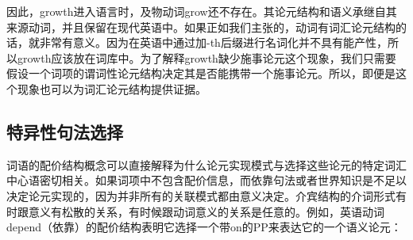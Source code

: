\begin{exe}
\begin{xlist}[iv.]
\begin{exe}
\begin{xlist}[iv.]
\noindent
因此，growth进入语言时，及物动词grow还不存在。其论元结构和语义承继自其来源动词，并且保留在现代英语中。如果正如我们主张的，动词有词汇论元结构的话，就非常有意义。因为在英语中通过加-th后缀进行名词化并不具有能产性，所以growth应该放在词库中。为了解释growth缺少施事论元这个现象，我们只需要假设一个词项的谓词性论元结构决定其是否能携带一个施事论元。所以，即便是这个现象也可以为词汇论元结构提供证据。

\subsection{特异性句法选择}
\label{sec-idiosyncratic-case-and-PP}


词语的配价结构概念可以直接解释为什么论元实现模式与选择这些论元的特定词汇中心语密切相关。如果词项中不包含配价信息，而依靠句法或者世界知识是不足以决定论元实现的，因为并非所有的关联模式都由意义决定。介宾结构的介词形式有时跟意义有松散的关系，有时候跟动词意义的关系是任意的。例如，英语动词depend（依靠）的配价结构表明它选择一个带on的PP来表达它的一个语义论元：


\end{xlist}
\end{exe}
\end{xlist}
\end{exe}
